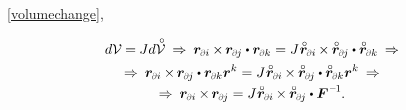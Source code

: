 ~\eqref{volumechange}, 

\nopagebreak\vspace{-0.4em}\begin{multline*}
d\mathcal{V} \hspace{-0.1ex} = \hspace{-0.1ex} J d\mathcircabove{\mathcal{V}}
\:\Rightarrow\:
\currentlocationvector_\differentialindex{i} \hspace{-0.1ex} \times \hspace{-0.2ex} \currentlocationvector_\differentialindex{\hspace{-0.1ex}j} \dotp \currentlocationvector_\differentialindex{k}
= J \hspace{.1ex} \initiallocationvector_\differentialindex{i} \hspace{-0.16ex} \times \hspace{-0.1ex} \initiallocationvector_\differentialindex{\hspace{-0.1ex}j} \dotp \initiallocationvector_\differentialindex{k}
\:\Rightarrow
\\
%
\Rightarrow\:
\currentlocationvector_\differentialindex{i} \hspace{-0.1ex} \times \hspace{-0.2ex} \currentlocationvector_\differentialindex{\hspace{-0.1ex}j} \dotp \currentlocationvector_\differentialindex{k} \currentlocationvector^k
= J \hspace{.1ex} \initiallocationvector_\differentialindex{i} \hspace{-0.16ex} \times \hspace{-0.1ex} \initiallocationvector_\differentialindex{\hspace{-0.1ex}j} \dotp \initiallocationvector_\differentialindex{k} \currentlocationvector^k
\:\Rightarrow
\\
%
\Rightarrow\:
\currentlocationvector_\differentialindex{i} \hspace{-0.1ex} \times \hspace{-0.2ex} \currentlocationvector_\differentialindex{\hspace{-0.1ex}j}
= J \hspace{.1ex} \initiallocationvector_\differentialindex{i} \hspace{-0.16ex} \times \hspace{-0.1ex} \initiallocationvector_\differentialindex{\hspace{-0.1ex}j} \dotp \bm{F}^{\hspace{.1ex}\expminusone}
\hspace{-0.1ex} .
\end{multline*}


